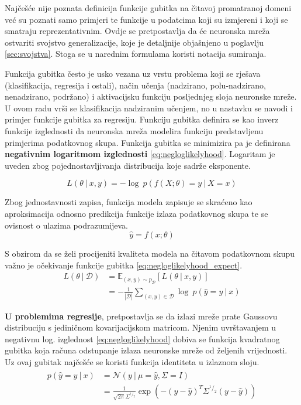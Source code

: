 \documentclass[times, utf8, numeric, diplomski]{fer}
\def\mat#1{\underline{#1}}
\def\expect{\mathbb{E}}
\def\normal{\mathcal{N}}
\def\probsep{\ |\ }
\def\dataset{\mathcal{D}}
\begin{document}
Najčešće nije poznata definicija funkcije gubitka na čitavoj promatranoj domeni već su poznati samo primjeri te funkcije u podatcima koji su izmjereni i koji se smatraju reprezentativnim. Ovdje se pretpostavlja da će neuronska mreža ostvariti svojstvo generalizacije, koje je detaljnije objašnjeno u poglavlju \ref{sec:svojstva}. Stoga se u narednim formulama koristi notacija sumiranja.

Funkcija gubitka često je usko vezana uz vrstu problema koji se rješava (klasifikacija, regresija i ostali), način učenja (nadzirano, polu-nadzirano, nenadzirano, podržano) i aktivacijsku funkciju posljednjeg sloja neuronske mreže. U ovom radu vrši se klasifikacija nadziranim učenjem, no u nastavku se navodi i primjer funkcije gubitka za regresiju. Funkciju gubitka definira se kao inverz funkcije izglednosti da neuronska mreža modelira funkciju predstavljenu primjerima podatkovnog skupa. Funkcija gubitka se minimizira pa je definirana \textbf{negativnim logaritmom izglednosti} \eqref{eq:negloglikelyhood}. Logaritam je uveden zbog pojednostavljivanja distribucija koje sadrže eksponente.

\begin{equation}
\label{eq:negloglikelyhood}
L(\theta \probsep x,y) = -\log\ p(f(X;\theta)=y \probsep X=x)
\end{equation}

Zbog jednostavnosti zapisa, funkcija modela zapisuje se skraćeno kao aproksimacija odnosno predikcija funkcije izlaza podatkovnog skupa te se ovisnost o ulazima podrazumijeva.
\begin{equation}
\hat{y} = f(x; \theta)
\end{equation}

S obzirom da se želi procijeniti kvaliteta modela na čitavom podatkovnom skupu važno je očekivanje funkcije gubitka \eqref{eq:negloglikelyhood_expect}.
\begin{equation}
\label{eq:negloglikelyhood_expect}
\begin{split}
L(\theta \probsep \dataset) &= \expect_{(x,y) \sim p_\dataset}[L(\theta \probsep x,y)] \\
&= -\frac{1}{|\dataset|} \sum_{(x,y)\in\dataset} \log\ p(\hat{y}=y \probsep x)
\end{split}
\end{equation}

\textbf{U problemima regresije}, pretpostavlja se da izlazi mreže prate Gaussovu distribuciju s jediničnom kovarijacijskom matricom. Njenim uvrštavanjem u negativnu log. izglednost \eqref{eq:negloglikelyhood} dobiva se funkcija kvadratnog gubitka koja računa odstupanje izlaza neuronske mreže od željenih vrijednosti. Uz ovaj gubitak najčešće se koristi funkcija identiteta u izlaznom sloju.
\begin{align}
\label{eq:normal_dist}
\begin{split}
p(\hat{y}=y \probsep x) &= \normal(y \probsep \mu=\hat{y}, \mat{\Sigma}=\mat{I}) \\
&= \frac{1}{\sqrt{2\pi}\Sigma^{^1/_2}} \exp(-(y-\hat{y})^T\Sigma^{^1/_2}(y-\hat{y}))
\end{split}
\end{align}
\end{document}
